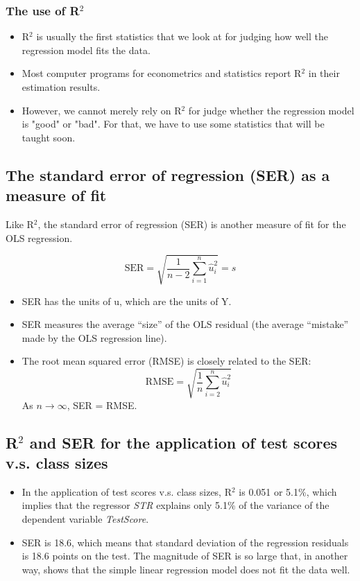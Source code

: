 \documentclass[a4paper,11pt]{article}
\begin{document}
\subsubsection*{The use of R\(^{\text{2}}\)}
\label{sec:orgd1ce4c0}
\begin{itemize}
\item R\(^{\text{2}}\) is usually the first statistics that we look at for judging
how well the regression model fits the data.
\item Most computer programs for econometrics and statistics report R\(^{\text{2}}\)
in their estimation results.
\item However, we cannot merely rely on R\(^{\text{2}}\) for judge whether the
regression model is "good" or "bad". For that, we have to use some
statistics that will be taught soon.
\end{itemize}

\subsection{The standard error of regression (SER) as a measure of fit}
\label{sec:orgca2a010}

Like R\(^{\text{2}}\), the standard error of regression (SER) is another measure
of fit for the OLS regression.

\begin{equation}
\label{eq:ser}
\mathrm{SER} = \sqrt{\frac{1}{n-2}\sum^n_{i=1} \hat{u}_i^2} = s
\end{equation}

\begin{itemize}
\item SER has the units of u, which are the units of Y.
\item SER measures the average “size” of the OLS residual (the average “mistake” made by the OLS regression line).
\item The root mean squared error (RMSE) is closely related to the SER:
\[ \mathrm{RMSE} = \sqrt{\frac{1}{n}\sum^n_{i=2} \hat{u}_i^2} \]
As \(n \rightarrow \infty\), SER = RMSE.
\end{itemize}

\subsection{R\(^{\text{2}}\) and SER for the application of test scores v.s. class sizes}
\label{sec:org14b315d}
\begin{itemize}
\item In the application of test scores v.s. class sizes, R\(^{\text{2}}\) is 0.051
or 5.1\%, which implies that the regressor \emph{STR} explains only 5.1\%
of the variance of the dependent variable \emph{TestScore}.
\item SER is 18.6, which means that standard deviation of the regression
residuals is 18.6 points on the test. The magnitude of SER is so
large that, in another way, shows that the simple linear regression
model does not fit the data well.
\end{itemize}
\end{document}
